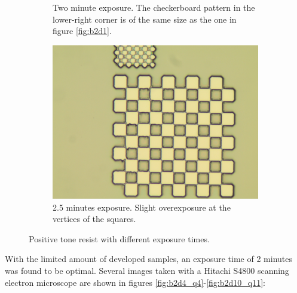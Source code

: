 \begin{figure}[ht]
\begin{subfigure}[t]{0.3\linewidth}
        \caption{Two minute exposure. The checkerboard pattern in the lower-right corner is of the same size as the one in figure \ref{fig:b2d1}.}
        \label{fig:b3a1}
    \end{subfigure}
    \hfill
    \begin{subfigure}[t]{0.3\linewidth}
        \centering
        \includegraphics[width=\textwidth]{data/b3e1.jpg}
        \caption{2.5 minutes exposure. Slight overexposure at the vertices of the squares.}
        \label{fig:b3e1}
    \end{subfigure}
    \hfill
    \caption{Positive tone resist with different exposure times.}
\end{figure}

With the limited amount of developed samples, an exposure time of 2 minutes was found to be optimal. Several images taken with a Hitachi S4800 scanning electron microscope are shown in figures \ref{fig:b2d4_q4}-\ref{fig:b2d10_q11}:

